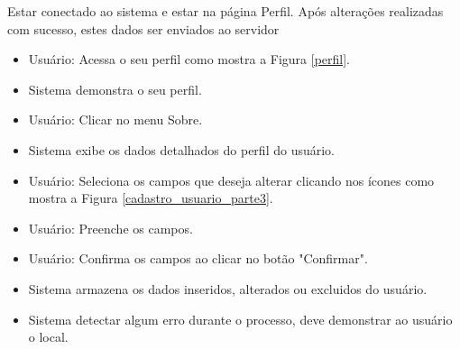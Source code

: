 {Estar conectado ao sistema e estar na página Perfil.}
{Após alterações realizadas com sucesso, estes dados ser enviados ao servidor}
{
\begin{itemize}
	\item Usuário: Acessa o seu perfil como mostra a Figura \ref{perfil}.
	\item Sistema demonstra o seu perfil.
	\item Usuário: Clicar no menu Sobre.
 	\item Sistema exibe os dados detalhados do perfil do usuário.
	\item Usuário: Seleciona os campos que deseja alterar clicando nos ícones como mostra a Figura \ref{cadastro_usuario_parte3}.
	\item Usuário: Preenche os campos.
	\item Usuário: Confirma os campos ao clicar no botão "Confirmar".
	\item Sistema armazena os dados inseridos, alterados ou excluidos do usuário.
	\item Sistema detectar algum erro durante o processo, deve demonstrar ao usuário o local.
\end{itemize}
}
